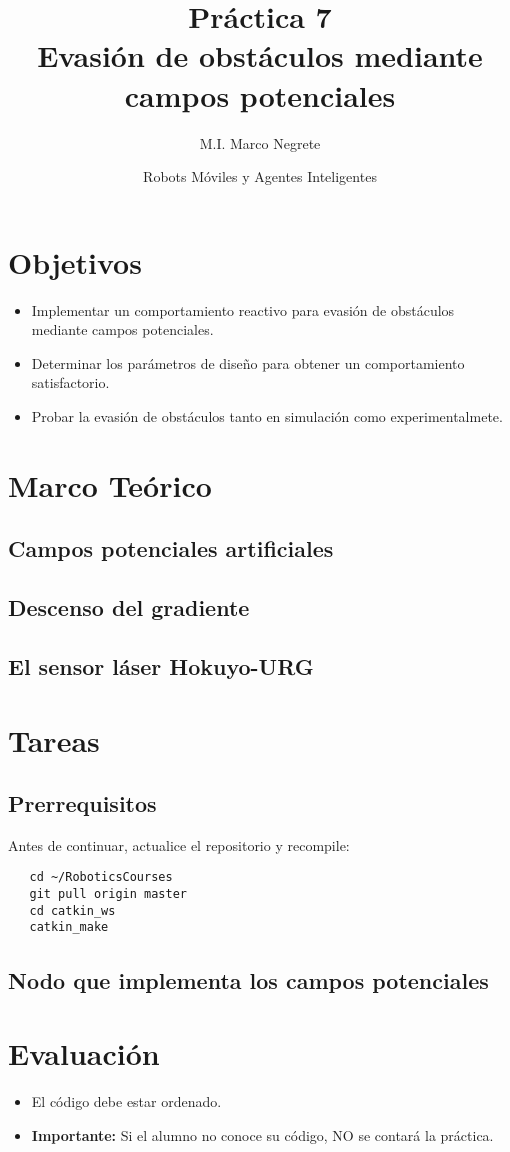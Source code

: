 \documentclass[letterpaper,12pt]{article}
\title{Práctica 7  \\ Evasión de obstáculos mediante campos potenciales}
\author{M.I. Marco Negrete}
\date{Robots Móviles y Agentes Inteligentes}
\begin{document}
\renewcommand{\tablename}{Tabla}
\maketitle
\section*{Objetivos}
\begin{itemize}
\item Implementar un comportamiento reactivo para evasión de obstáculos mediante campos potenciales.
\item Determinar los parámetros de diseño para obtener un comportamiento satisfactorio.
\item Probar la evasión de obstáculos tanto en simulación como experimentalmete.
\end{itemize}

\section{Marco Teórico}
\subsection{Campos potenciales artificiales}

\subsection{Descenso del gradiente}

\subsection{El sensor láser Hokuyo-URG}

\section{Tareas}

\subsection{Prerrequisitos}
Antes de continuar, actualice el repositorio y recompile:
\begin{verbatim}
   cd ~/RoboticsCourses
   git pull origin master
   cd catkin_ws
   catkin_make
\end{verbatim}


\subsection{Nodo que implementa los campos potenciales}

\section{Evaluación}
\begin{itemize}
\item El código debe estar ordenado.
\item \textbf{Importante: } Si el alumno no conoce su código, NO se contará la práctica.
\end{itemize}
\end{document}
